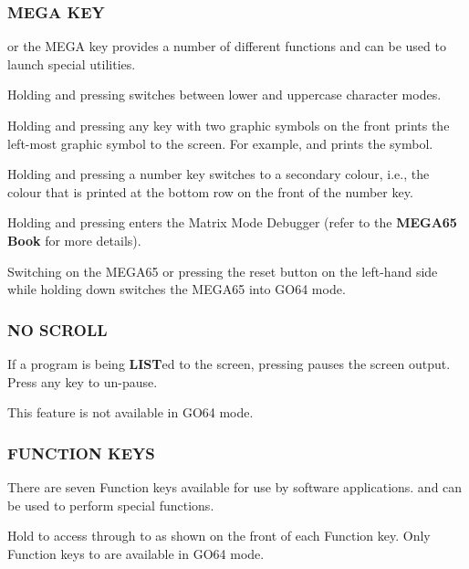 \subsubsection{MEGA KEY}
\megasymbolkey or the MEGA key provides a number of different functions and can be used to launch special utilities.

Holding  and pressing \megasymbolkey switches between lower and uppercase character modes.

Holding \megasymbolkey and pressing any key with two graphic symbols on the front prints the left-most graphic symbol to the screen. For example,
\megasymbolkey and  prints the  symbol.

Holding \megasymbolkey and pressing a number key switches to a secondary colour, i.e., the colour that is printed at the bottom row on the front of the number key.

Holding \megasymbolkey and pressing  enters the Matrix Mode Debugger (refer to the {\bf MEGA65 Book} for more details).

Switching on the MEGA65 or pressing the reset button on the left-hand side while holding down \megasymbolkey switches the MEGA65 into GO64 mode.

\subsubsection{NO SCROLL}
If a program is being {\bf LIST}ed to the screen, pressing  pauses the screen output. Press any key to un-pause.

This feature is not available in GO64 mode.

\subsubsection{FUNCTION KEYS}
There are seven Function keys available for use by software applications.       and  can be used to perform special functions.

Hold  to access  through to  as shown on the front of each Function key.
Only Function keys  to  are available in GO64 mode.

